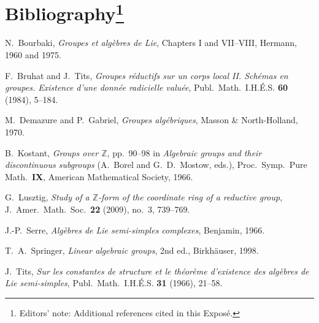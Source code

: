 \section*{Bibliography\footnote{Editors' note: Additional references
cited in this Exposé.}}

\begin{description}[style=multiline,leftmargin=4.8em,labelwidth=4.0em]
\item[\textup{[BLie]}]
N.~Bourbaki, \textit{Groupes et algèbres de Lie}, Chapters I and
VII--VIII, Hermann, 1960 and 1975.

\item[\textup{[BT84]}]
F.~Bruhat and J.~Tits, \textit{Groupes réductifs sur un corps local II.
Schémas en groupes. Existence d'une donnée radicielle valuée},
Publ.\ Math.\ I.H.É.S. \textbf{60} (1984), 5--184.

\item[\textup{[DG70]}]
M.~Demazure and P.~Gabriel, \textit{Groupes algébriques},
Masson \& North-Holland, 1970.

\item[\textup{[Ko66]}]
B.~Kostant, \textit{Groups over \(\mathbb Z\)}, pp.~90--98 in
\textit{Algebraic groups and their discontinuous subgroups}
(A.~Borel and G.~D.~Mostow, eds.), Proc.\ Symp.\ Pure Math.\
\textbf{IX}, American Mathematical Society, 1966.

\item[\textup{[Lu09]}]
G.~Lusztig, \textit{Study of a \(\mathbb Z\)-form of the coordinate
ring of a reductive group}, J.\ Amer.\ Math.\ Soc.\ \textbf{22}
(2009), no.~3, 739--769.

\item[\textup{[Se66]}]
J.-P.~Serre, \textit{Algèbres de Lie semi-simples complexes},
Benjamin, 1966.

\item[\textup{[Sp98]}]
T.~A.~Springer, \textit{Linear algebraic groups}, 2nd ed.,
Birkhäuser, 1998.

\item[\textup{[Ti66]}]
J.~Tits, \textit{Sur les constantes de structure et le théorème
d'existence des algèbres de Lie semi-simples},
Publ.\ Math.\ I.H.É.S. \textbf{31} (1966), 21--58.
\end{description}




